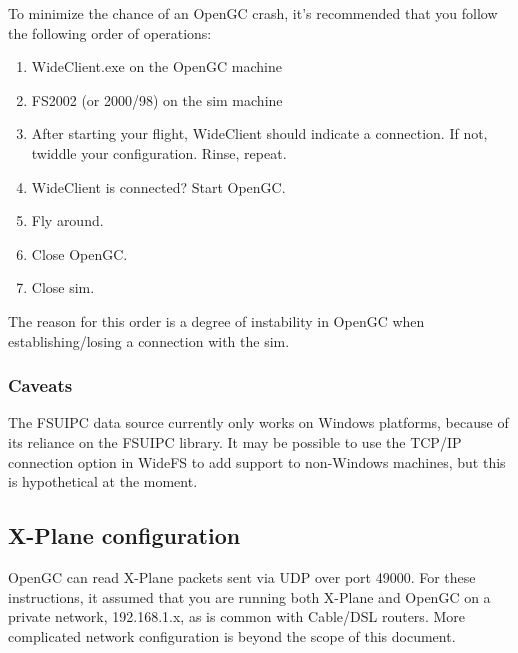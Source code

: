 \documentclass[11pt]{article}
\begin{document}
To minimize the chance of an OpenGC crash, it's recommended that you follow the following order of operations:

\begin{enumerate}
\item WideClient.exe on the OpenGC machine
\item FS2002 (or 2000/98) on the sim machine
\item After starting your flight, WideClient should indicate a connection. If not, twiddle your configuration. Rinse, repeat.
\item WideClient is connected? Start OpenGC.
\item Fly around.
\item Close OpenGC.
\item Close sim.
\end{enumerate}

The reason for this order is a degree of instability in OpenGC when establishing/losing a connection with the sim.

\subsubsection{Caveats}

The FSUIPC data source currently only works on Windows platforms, because of its reliance on the FSUIPC library. It may be possible to use the TCP/IP connection option in WideFS to add support to non-Windows machines, but this is hypothetical at the moment.

\subsection{X-Plane configuration}

OpenGC can read X-Plane packets sent via UDP over port 49000. For these instructions, it assumed that you are running both X-Plane and OpenGC on a private network, 192.168.1.x, as is common with Cable/DSL routers. More complicated network configuration is beyond the scope of this document.
\end{document}
